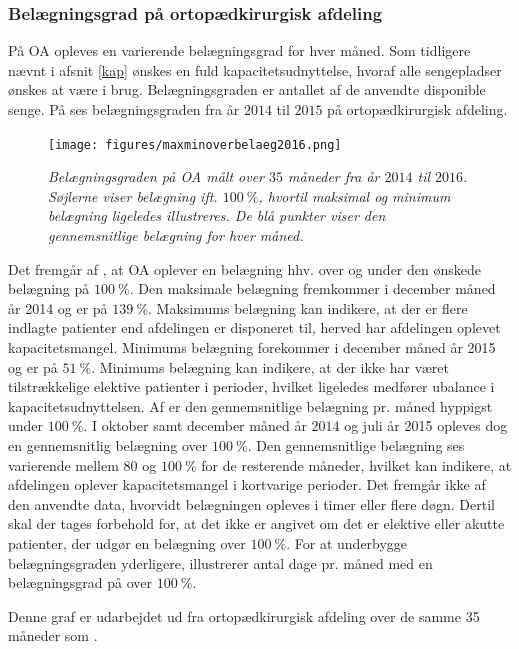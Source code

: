 \subsubsection{Belægningsgrad på ortopædkirurgisk afdeling}\label{omfang}
På OA opleves en varierende belægningsgrad for hver måned. Som tidligere nævnt i afsnit \ref{kap} ønskes en fuld kapacitetsudnyttelse, hvoraf alle sengepladser ønskes at være i brug. Belægningsgraden er antallet af de anvendte disponible senge. På  ses belægningsgraden fra år $2014$ til $2015$ på ortopædkirurgisk afdeling.\cite{SDS2015}

\begin{figure}[H]
	\flushleft 
	\centering
	\texttt{[image: figures/maxminoverbelaeg2016.png]}
	\flushleft
	\caption{\textit{Belægningsgraden på OA målt over $35$ måneder fra år $2014$ til $2016$. Søjlerne viser belægning ift. $100~\%$, hvortil maksimal og minimum belægning ligeledes illustreres. De blå punkter viser den gennemsnitlige belægning for hver måned.}\cite{SDS2015}}
	\label{maxminbelaeg}
\end{figure}

\noindent
Det fremgår af , at OA oplever en belægning hhv. over og under den ønskede belægning på $100~\%$. Den maksimale belægning fremkommer i december måned år 2014 og er på $139~\%$. Maksimums belægning kan indikere, at der er flere indlagte patienter end afdelingen er disponeret til, herved har afdelingen oplevet kapacitetsmangel. Minimums belægning forekommer i december måned år 2015 og er på $51~\%$. Minimums belægning kan indikere, at der ikke har været tilstrækkelige elektive patienter i perioder, hvilket ligeledes medfører ubalance i kapacitetsudnyttelsen. Af  er den gennemsnitlige belægning pr. måned hyppigst under $100~\%$. I oktober samt december måned år $2014$ og juli år 2015 opleves dog en gennemsnitlig belægning over $100~\%$. Den gennemsnitlige belægning ses varierende mellem $80$ og $100~\%$ for de resterende måneder, hvilket kan indikere, at afdelingen oplever kapacitetsmangel i kortvarige perioder.\cite{SDS2015} 
Det fremgår ikke af den anvendte data, hvorvidt belægningen opleves i timer eller flere døgn. Dertil skal der tages forbehold for, at det ikke er angivet om det er elektive eller akutte patienter, der udgør en belægning over $100~\%$.\cite{SDS2015} 
For at underbygge belægningsgraden yderligere, illustrerer  antal dage pr. måned med en belægningsgrad på over $100~\%$. 

Denne graf er udarbejdet ud fra ortopædkirurgisk afdeling over de samme 35 måneder som .\cite{SDS2015} 

